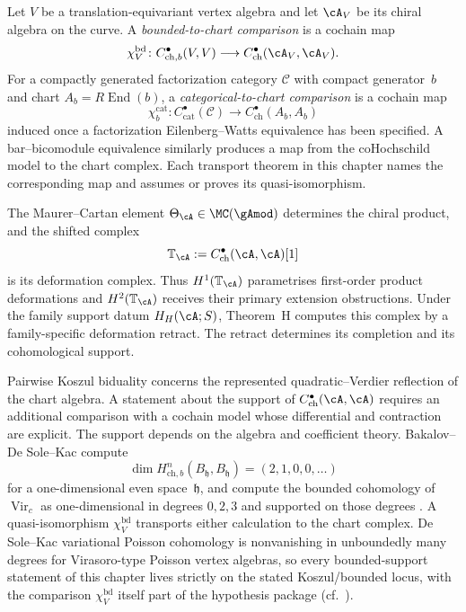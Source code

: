 \begin{definition}
\label{def:theorem-h-comparison-datum}
Let \(V\) be a translation-equivariant vertex algebra and let
\(\cA_V\) be its chiral algebra on the curve.  A
\emph{bounded-to-chart comparison} is a cochain map
\[
 \chi_V^{\mathrm{bd}}
 \colon C^\bullet_{\mathrm{ch},b}(V,V)
 \longrightarrow C^\bullet_{\mathrm{ch}}(\cA_V,\cA_V).
\]
For a compactly generated factorization category \(\mathcal C\) with
compact generator~\(b\) and chart \(A_b=R\operatorname{End}(b)\), a
\emph{categorical-to-chart comparison} is a cochain map
\[
 \chi_b^{\mathrm{cat}}
 \colon C^\bullet_{\mathrm{cat}}(\mathcal C)
 \longrightarrow C^\bullet_{\mathrm{ch}}(A_b,A_b)
\]
induced once a factorization Eilenberg--Watts equivalence has been
specified.  A
bar--bicomodule equivalence similarly produces a map from the
coHochschild model to the chart complex.  Each transport theorem in
this chapter names the corresponding map and assumes or proves its
quasi-isomorphism.
\end{definition}

The Maurer--Cartan element
$\Theta_\cA\in\MC(\gAmod)$ determines the chiral product, and the
shifted complex
\[
 \mathbb T_\cA:=C^\bullet_{\mathrm{ch}}(\cA,\cA)[1]
\]
is its deformation complex.  Thus $H^1(\mathbb T_\cA)$ parametrises
first-order product deformations and $H^2(\mathbb T_\cA)$ receives
their primary extension obstructions.  Under the family support datum
$H_H(\cA;S)$, Theorem~H computes this complex by a family-specific
deformation retract.  The retract determines its completion and its
cohomological support.

Pairwise Koszul biduality concerns the represented
quadratic--Verdier reflection of the chart algebra.  A statement about the support of
$C^\bullet_{\mathrm{ch}}(\cA,\cA)$ requires an additional comparison
with a cochain model whose differential and contraction are explicit.
The support depends on the algebra and coefficient theory.
Bakalov--De Sole--Kac compute
\[
 \dim H^n_{\mathrm{ch},b}(B_{\mathfrak h},B_{\mathfrak h})
 =(2,1,0,0,\ldots)
\]
for a one-dimensional even space~\(\mathfrak h\), and compute the
bounded cohomology of \(\operatorname{Vir}_c\) as one-dimensional in
degrees \(0,2,3\) and supported on those degrees
\cite[Theorems~7.4 and~7.2]{BDSK21}.  A quasi-isomorphism
\(\chi_V^{\mathrm{bd}}\) transports either calculation to the chart
complex.  De Sole--Kac variational Poisson cohomology is nonvanishing
in unboundedly many degrees for Virasoro-type Poisson vertex algebras,
so every bounded-support statement of this chapter lives strictly on
the stated Koszul/bounded locus, with the comparison
\(\chi_V^{\mathrm{bd}}\) itself part of the hypothesis package
(cf.\ \cite{BDSK21}).

